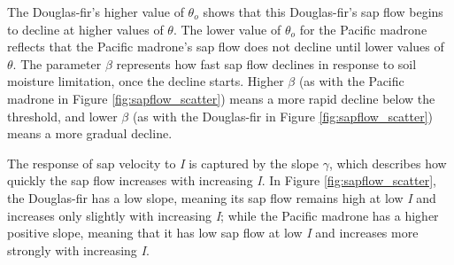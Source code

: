 The Douglas-fir's higher value of $\theta_o$ shows that this Douglas-fir's sap flow begins to decline at higher values of $\theta$.  The lower value of $\theta_o$ for the Pacific madrone reflects that the Pacific madrone's sap flow does not decline until lower values of $\theta$.  The parameter $\beta$ represents how fast sap flow declines in response to soil moisture limitation, once the decline starts.  Higher $\beta$ (as with the Pacific madrone in Figure \ref{fig:sapflow_scatter}) means a more rapid decline below the threshold, and lower $\beta$ (as with the Douglas-fir in Figure \ref{fig:sapflow_scatter}) means a more gradual decline.

The response of sap velocity to \textit{I} is captured by the slope $\gamma$, which describes how quickly the sap flow increases with increasing \textit{I}.  In Figure \ref{fig:sapflow_scatter}, the Douglas-fir has a low slope, meaning its sap flow remains high at low \textit{I} and increases only slightly with increasing \textit{I}; while the Pacific madrone has a higher positive slope, meaning that it has low sap flow at low \textit{I} and increases more strongly with increasing \textit{I}.

